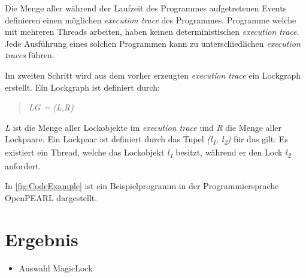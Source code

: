 Die Menge aller während der Laufzeit des Programmes aufgetretenen Events
definieren einen möglichen \textit{execution trace} des Programmes.
Programme welche mit mehreren Threads arbeiten, haben keinen deterministischen
\textit{execution trace}. Jede Ausführung eines solchen Programmen kann zu
unterschiedlichen \textit{execution traces} führen. 

Im zweiten Schritt wird aus dem vorher erzeugten \textit{execution trace} ein
Lockgraph erstellt. Ein Lockgraph ist definiert durch:
\begin{quote}
\textit{LG = (L,R)}
\end{quote}
\textit{L} ist die Menge aller Lockobjekte im \textit{execution trace} und
\textit{R} die Menge aller Lockpaare. Ein Lockpaar ist definiert durch das Tupel
\textit{(l\textsubscript{1}, l\textsubscript{2})} für das gilt: Es existiert ein
Thread, welche das Lockobjekt \textit{l\textsubscript{1}} besitzt, während er
den Lock \textit{l\textsubscript{2}} anfordert.

In \cref{fig:CodeExample} ist ein Beispielprogramm in der Programmiersprache
OpenPEARL dargestellt.



\section{Ergebnis}\label{Ergebnis}
\begin{itemize}
  \item Auswahl MagicLock\cite{MagicLock}
\end{itemize}